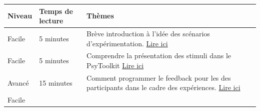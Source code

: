 \documentclass[
]{book}
\begin{document}
\begin{longtable}[]{@{}lll@{}}
\toprule
\begin{minipage}[b]{0.11\columnwidth}\raggedright
Niveau\strut
\end{minipage} & \begin{minipage}[b]{0.13\columnwidth}\raggedright
Temps de lecture\strut
\end{minipage} & \begin{minipage}[b]{0.67\columnwidth}\raggedright
Thèmes\strut
\end{minipage}\tabularnewline
\midrule
\endhead
\begin{minipage}[t]{0.11\columnwidth}\raggedright
Facile\strut
\end{minipage} & \begin{minipage}[t]{0.13\columnwidth}\raggedright
5 minutes\strut
\end{minipage} & \begin{minipage}[t]{0.67\columnwidth}\raggedright
Brève introduction à l'idée des scénarios d'expérimentation.
\protect\hyperlink{s4-1}{Lire ici}\strut
\end{minipage}\tabularnewline
\begin{minipage}[t]{0.11\columnwidth}\raggedright
Facile\strut
\end{minipage} & \begin{minipage}[t]{0.13\columnwidth}\raggedright
5 minutes\strut
\end{minipage} & \begin{minipage}[t]{0.67\columnwidth}\raggedright
Comprendre la présentation des stimuli dans le PsyToolkit
\protect\hyperlink{s4-2}{Lire ici}\strut
\end{minipage}\tabularnewline
\begin{minipage}[t]{0.11\columnwidth}\raggedright
Avancé\strut
\end{minipage} & \begin{minipage}[t]{0.13\columnwidth}\raggedright
15 minutes\strut
\end{minipage} & \begin{minipage}[t]{0.67\columnwidth}\raggedright
Comment programmer le feedback pour les des participants dans le cadre
des expériences. \protect\hyperlink{s4-3}{Lire ici}\strut
\end{minipage}\tabularnewline
\begin{minipage}[t]{0.11\columnwidth}\raggedright
Facile\strut
\end{minipage} & \begin{minipage}[t]{0.13\columnwidth}\raggedright

\end{minipage}
\end{longtable}
\end{document}
